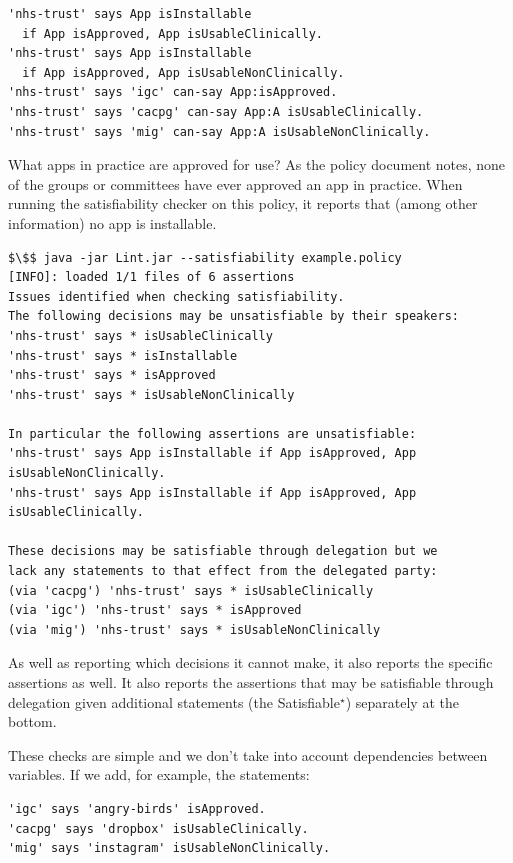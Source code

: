 \documentclass[thesis.tex]{subfiles}
\begin{document}
\begin{lstlisting}
'nhs-trust' says App isInstallable
  if App isApproved, App isUsableClinically.
'nhs-trust' says App isInstallable
  if App isApproved, App isUsableNonClinically.
'nhs-trust' says 'igc' can-say App:isApproved.
'nhs-trust' says 'cacpg' can-say App:A isUsableClinically.
'nhs-trust' says 'mig' can-say App:A isUsableNonClinically.
\end{lstlisting}

What apps in practice are approved for use?
As the policy document notes, none of the groups or committees have ever
approved an app in practice.
When running the satisfiability checker on this policy,
it reports that (among other information) no app is installable.

\noindent\begin{minipage}{\textwidth}\vspace{1em}
\begin{lstlisting}
$\$$ java -jar Lint.jar --satisfiability example.policy
[INFO]: loaded 1/1 files of 6 assertions
Issues identified when checking satisfiability.
The following decisions may be unsatisfiable by their speakers:
'nhs-trust' says * isUsableClinically
'nhs-trust' says * isInstallable
'nhs-trust' says * isApproved
'nhs-trust' says * isUsableNonClinically

In particular the following assertions are unsatisfiable:
'nhs-trust' says App isInstallable if App isApproved, App isUsableNonClinically.
'nhs-trust' says App isInstallable if App isApproved, App isUsableClinically.

These decisions may be satisfiable through delegation but we
lack any statements to that effect from the delegated party:
(via 'cacpg') 'nhs-trust' says * isUsableClinically
(via 'igc') 'nhs-trust' says * isApproved
(via 'mig') 'nhs-trust' says * isUsableNonClinically
\end{lstlisting}
\end{minipage}

As well as reporting which decisions it cannot make, it also reports the
specific assertions as well. It also reports the assertions that may be
satisfiable through delegation given additional statements (the
Satisfiable$^\star$) separately at the bottom.

\noindent\begin{minipage}{\textwidth}
These checks are simple and we don't take into
account dependencies between variables. If we add, for example, the statements:

\begin{lstlisting}
'igc' says 'angry-birds' isApproved.
'cacpg' says 'dropbox' isUsableClinically.
'mig' says 'instagram' isUsableNonClinically.
\end{lstlisting}
\end{minipage}
\end{document}
